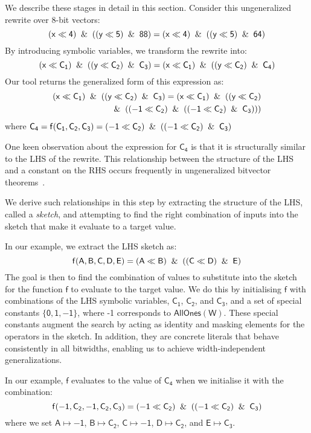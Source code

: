 \documentclass[review, anonymous, acmsmall]{acmart}
\newcommand{\blockmath}[1]{\[\mathsf{#1}\]}
\newcommand{\inline}[1]{$\mathsf{#1}$}
\begin{document}
We describe these stages in detail in this section. 
Consider this ungeneralized rewrite over 8-bit vectors:
\blockmath{(x \ll 4) \And ((y \ll 5) \And 88) = (x \ll 4) \And ((y \ll 5) \And 64)}
By introducing symbolic variables, we transform the rewrite into:
\blockmath{(x \ll C_1) \And ((y \ll C_2) \And C_3) = (x \ll C_1) \And ((y \ll C_2) \And C_4)}
Our tool returns the generalized form of this expression as:
\begin{align*}
\mathsf{
(x \ll C_1) \And ((y \ll C_2) \And C_3) = (x \ll C_1)  \And ((y \ll C_2)} \\ 
\mathsf{\And ((-1 \ll C_2) \And ((-1 \ll C_2) \And C_3)))}
\end{align*}
where \inline{C_4 = f(C_1, C_2, C_3) = (-1 \ll C_2) \And ((-1 \ll C_2) \And C_3)}

One keen observation about the expression for \inline{C_4} is that it is structurally similar to the LHS of the rewrite. This relationship between the structure of the LHS and a constant on the RHS occurs frequently in ungeneralized bitvector theorems~\cite{mukherjee_hydra_2024}.  


We derive such relationships in this step by extracting the structure of the LHS, called a \textit{sketch}, and attempting to find the right combination of inputs into the sketch that make it evaluate to a target value. 

In our example, we extract the LHS sketch as:
\blockmath{f(A,B,C,D,E) = (A \ll B) \And ((C \ll D) \And E)}
The goal is then to find the combination of values to substitute into the sketch for the function \inline{f} to evaluate to the target value. We do this by initialising \inline{f} with combinations of the LHS symbolic variables, \inline{C_1}, \inline{C_2}, and \inline{C_3}, and a set of special constants \inline{\{0, 1, {-1}\}}, where -1 corresponds to \inline{AllOnes(W)}. These special constants augment the search by acting as identity and masking elements for the operators in the sketch. In addition, they are concrete literals that behave consistently in all bitwidths, enabling us to achieve width-independent generalizations.  

In our example, \inline{f} evaluates to the value of \inline{C_4} when we initialise it with the combination:
\blockmath{f({-1}, C_2, {-1}, C_2, C_3) = ({-1} \ll C_2) \And (({-1} \ll C_2) \And C_3)}
where we set \inline{A \mapsto {-1}}, \inline{B \mapsto C_2}, \inline{C \mapsto {-1}}, \inline{D \mapsto C_2}, and \inline{E \mapsto C_3}.
\end{document}
